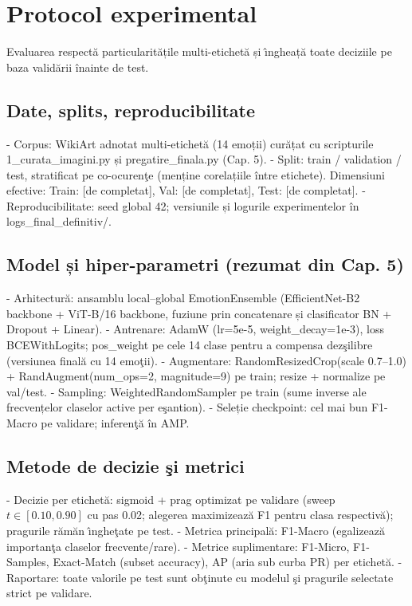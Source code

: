 \section{Protocol experimental}
Evaluarea respectă particularitățile multi-etichet\u{a} și \^{\i}ngheață toate deciziile pe baza validării înainte de test.

\subsection{Date, splits, reproducibilitate}
- Corpus: WikiArt adnotat multi-etichet\u{a} (14 emoții) curățat cu scripturile 1\_curata\_imagini.py și pregatire\_finala.py (Cap. 5).
- Split: train / validation / test, stratificat pe co-ocuren\c{t}e (menține corelațiile între etichete). Dimensiuni efective: Train: [de completat], Val: [de completat], Test: [de completat].
- Reproducibilitate: seed global 42; versiunile și logurile experimentelor în logs\_final\_definitiv/.

\subsection{Model și hiper-parametri (rezumat din Cap. 5)}
- Arhitectură: ansamblu local–global EmotionEnsemble (EfficientNet-B2 backbone + ViT-B/16 backbone, fuziune prin concatenare și clasificator BN + Dropout + Linear).
- Antrenare: AdamW (lr=5e-5, weight\_decay=1e-3), loss BCEWithLogits; pos\_weight pe cele 14 clase pentru a compensa dez\c{s}ilibre (versiunea final\u{a} cu 14 emo\c{t}ii).
- Augmentare: RandomResizedCrop(scale 0.7–1.0) + RandAugment(num\_ops=2, magnitude=9) pe train; resize + normalize pe val/test.
- Sampling: WeightedRandomSampler pe train (sume inverse ale frecvențelor claselor active per e\c{s}antion).
- Seleție checkpoint: cel mai bun F1-Macro pe validare; inferen\c{t}\u{a} în AMP.

\subsection{Metode de decizie \c{s}i metrici}
- Decizie per etichet\u{a}: sigmoid + prag optimizat pe validare (sweep $t \in [0.10, 0.90]$ cu pas 0.02; alegerea maximizeaz\u{a} F1 pentru clasa respectiv\u{a}); pragurile r\u{a}m\u{a}n \^{\i}nghe\c{t}ate pe test.
- Metrica principal\u{a}: F1-Macro (egalizeaz\u{a} importan\c{t}a claselor frecvente/rare).
- Metrice suplimentare: F1-Micro, F1-Samples, Exact-Match (subset accuracy), AP (aria sub curba PR) per etichet\u{a}.
- Raportare: toate valorile pe test sunt ob\c{t}inute cu modelul \c{s}i pragurile selectate strict pe validare.

